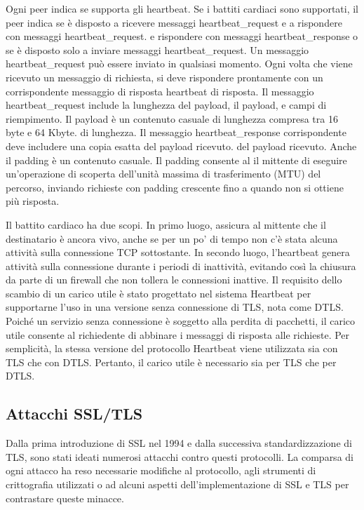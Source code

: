 Ogni peer indica se supporta gli heartbeat. Se i battiti cardiaci sono supportati, il peer indica se è disposto a ricevere messaggi heartbeat\_request e a rispondere con messaggi heartbeat\_request. e rispondere con messaggi heartbeat\_response o se è disposto solo a inviare messaggi heartbeat\_request. Un messaggio heartbeat\_request può essere inviato in qualsiasi momento. Ogni volta che viene ricevuto un messaggio di richiesta, si deve rispondere prontamente con un corrispondente messaggio di risposta heartbeat di risposta. Il messaggio heartbeat\_request include la lunghezza del payload, il payload, e campi di riempimento. Il payload è un contenuto casuale di lunghezza compresa tra 16 byte e 64 Kbyte. di lunghezza. Il messaggio heartbeat\_response corrispondente deve includere una copia esatta del payload ricevuto. del payload ricevuto. Anche il padding è un contenuto casuale. Il padding consente al il mittente di eseguire un'operazione di scoperta dell'unità massima di trasferimento (MTU) del percorso, inviando richieste con padding crescente fino a quando non si ottiene più risposta. 

\singlespacing

Il battito cardiaco ha due scopi. In primo luogo, assicura al mittente che il destinatario è ancora vivo, anche se per un po' di tempo non c'è stata alcuna attività sulla connessione TCP sottostante. In secondo luogo, l'heartbeat genera attività sulla connessione durante i periodi di inattività, evitando così la chiusura da parte di un firewall che non tollera le connessioni inattive. Il requisito dello scambio di un carico utile è stato progettato nel sistema Heartbeat
per supportarne l'uso in una versione senza connessione di TLS, nota come DTLS. Poiché un servizio senza connessione è soggetto alla perdita di pacchetti, il carico utile consente al richiedente di abbinare i messaggi di risposta alle richieste. Per semplicità, la stessa versione del protocollo Heartbeat viene utilizzata sia con TLS che con DTLS. Pertanto, il carico utile è necessario sia per TLS che per DTLS.

\newpage

\subsection{Attacchi SSL/TLS}
Dalla prima introduzione di SSL nel 1994 e dalla successiva standardizzazione di TLS, sono stati ideati numerosi attacchi contro questi protocolli. La comparsa di ogni attacco ha reso necessarie modifiche al protocollo, agli strumenti di crittografia utilizzati o ad alcuni aspetti dell'implementazione di SSL e TLS per contrastare queste minacce.

